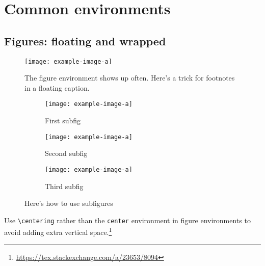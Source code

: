 
\section{Common environments}

\subsection{Figures: floating and wrapped}

\begin{figure}%
    \centering
    \texttt{[image: example-image-a]}
    \caption[The figure environment shows up often. Here's a trick for footnotes in a floating caption.]{The figure environment shows up often. Here's a trick for footnotes in a floating caption.\footnotemark
    \label{fig:figure:example}}
\end{figure} 


\begin{figure}%
    \centering
	\begin{subfigure}{0.3\textwidth}
    \centering
        \texttt{[image: example-image-a]}
        \caption{First subfig}
        \label{fig:subfig:1}
    \end{subfigure}\;%
    \begin{subfigure}{0.3\textwidth}
    \centering
        \texttt{[image: example-image-a]}
        \caption{Second subfig}
        \label{fig:subfig:2}
    \end{subfigure}\;%
    \begin{subfigure}{0.3\textwidth}
    \centering
        \texttt{[image: example-image-a]}
        \caption{Third subfig}
        \label{fig:subfig:3}
    \end{subfigure}%
    \caption{Here's how to use subfigures}
    \label{fig:subfigure:example}
\end{figure}

Use 
\verb!\centering!
rather than the \texttt{center} environment in figure environments to avoid adding extra vertical space.\footnote{\url{https://tex.stackexchange.com/a/23653/8094}\label{foot:centering}}

